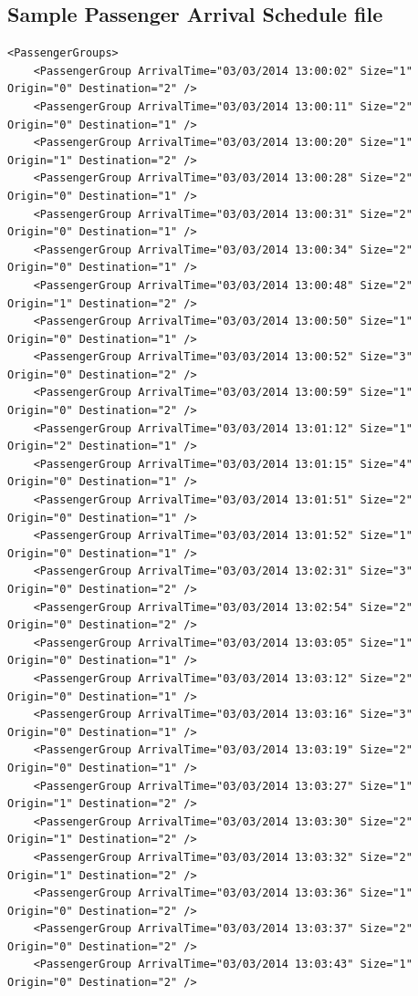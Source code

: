 \documentclass{UoYCSproject}
\begin{document}
\begin{appendices}
\subsection{Sample Passenger Arrival Schedule file}
\lstset{language=XML}
\begin{lstlisting}
<PassengerGroups>
	<PassengerGroup ArrivalTime="03/03/2014 13:00:02" Size="1" Origin="0" Destination="2" />
	<PassengerGroup ArrivalTime="03/03/2014 13:00:11" Size="2" Origin="0" Destination="1" />
	<PassengerGroup ArrivalTime="03/03/2014 13:00:20" Size="1" Origin="1" Destination="2" />
	<PassengerGroup ArrivalTime="03/03/2014 13:00:28" Size="2" Origin="0" Destination="1" />
	<PassengerGroup ArrivalTime="03/03/2014 13:00:31" Size="2" Origin="0" Destination="1" />
	<PassengerGroup ArrivalTime="03/03/2014 13:00:34" Size="2" Origin="0" Destination="1" />
	<PassengerGroup ArrivalTime="03/03/2014 13:00:48" Size="2" Origin="1" Destination="2" />
	<PassengerGroup ArrivalTime="03/03/2014 13:00:50" Size="1" Origin="0" Destination="1" />
	<PassengerGroup ArrivalTime="03/03/2014 13:00:52" Size="3" Origin="0" Destination="2" />
	<PassengerGroup ArrivalTime="03/03/2014 13:00:59" Size="1" Origin="0" Destination="2" />
	<PassengerGroup ArrivalTime="03/03/2014 13:01:12" Size="1" Origin="2" Destination="1" />
	<PassengerGroup ArrivalTime="03/03/2014 13:01:15" Size="4" Origin="0" Destination="1" />
	<PassengerGroup ArrivalTime="03/03/2014 13:01:51" Size="2" Origin="0" Destination="1" />
	<PassengerGroup ArrivalTime="03/03/2014 13:01:52" Size="1" Origin="0" Destination="1" />
	<PassengerGroup ArrivalTime="03/03/2014 13:02:31" Size="3" Origin="0" Destination="2" />
	<PassengerGroup ArrivalTime="03/03/2014 13:02:54" Size="2" Origin="0" Destination="2" />
	<PassengerGroup ArrivalTime="03/03/2014 13:03:05" Size="1" Origin="0" Destination="1" />
	<PassengerGroup ArrivalTime="03/03/2014 13:03:12" Size="2" Origin="0" Destination="1" />
	<PassengerGroup ArrivalTime="03/03/2014 13:03:16" Size="3" Origin="0" Destination="1" />
	<PassengerGroup ArrivalTime="03/03/2014 13:03:19" Size="2" Origin="0" Destination="1" />
	<PassengerGroup ArrivalTime="03/03/2014 13:03:27" Size="1" Origin="1" Destination="2" />
	<PassengerGroup ArrivalTime="03/03/2014 13:03:30" Size="2" Origin="1" Destination="2" />
	<PassengerGroup ArrivalTime="03/03/2014 13:03:32" Size="2" Origin="1" Destination="2" />
	<PassengerGroup ArrivalTime="03/03/2014 13:03:36" Size="1" Origin="0" Destination="2" />
	<PassengerGroup ArrivalTime="03/03/2014 13:03:37" Size="2" Origin="0" Destination="2" />
	<PassengerGroup ArrivalTime="03/03/2014 13:03:43" Size="1" Origin="0" Destination="2" />

\end{lstlisting}
\end{appendices}
\end{document}
